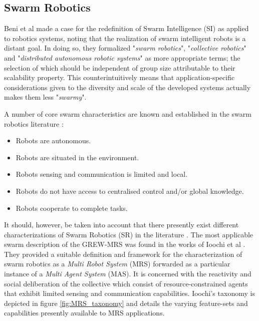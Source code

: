 \documentclass{report}
\begin{document}
\subsection{Swarm Robotics}
Beni et al \cite{Beni2005a} made a case for the redefinition of Swarm Intelligence (SI) as applied to robotics systems, noting that the realization of swarm intelligent robots is a distant goal. In doing so, they formalized "\textit{swarm robotics}", "\textit{collective robotics}" and "\textit{distributed autonomous robotic systems}" as more appropriate terms; the selection of which should be independent of group size attributable to their scalability property. This counterintuitively means that application-specific considerations given to the diversity and scale of the developed systems actually makes them less "\textit{swarmy}".

A number of core swarm characteristics are known and established in the swarm robotics literature \cite{Brambilla2013a}:
\begin{itemize}
	\item Robots are autonomous.
	\item Robots are situated in the environment.
	\item Robots sensing and communication is limited and local.
	\item Robots do not have access to centralised control and/or global knowledge.
	\item Robots cooperate to complete tasks.
\end{itemize}

It should, however, be taken into account that there presently exist different characterizations of Swarm Robotics (SR) in the literature \cite{Sahin2005} \cite{Beni2005a} \cite{Dorigo2013} \cite{DorigoSahin2004}. The most applicable swarm description of the GREW-MRS was found in the works of Ioochi et al \cite{Iocchi2001}. They provided a suitable definition and framework for the characterization of swarm robotics as a \textit{Multi Robot System} (MRS) forwarded as a particular instance of a \textit{Multi Agent System} (MAS). It is concerned with the reactivity and social deliberation of the collective which consist of resource-constrained agents that exhibit limited sensing and communication capabilities. Ioochi's taxonomy is depicted in figure \ref{fig:MRS_taxonomy} and details the varying feature-sets and capabilities presently available to MRS applications.
\end{document}
